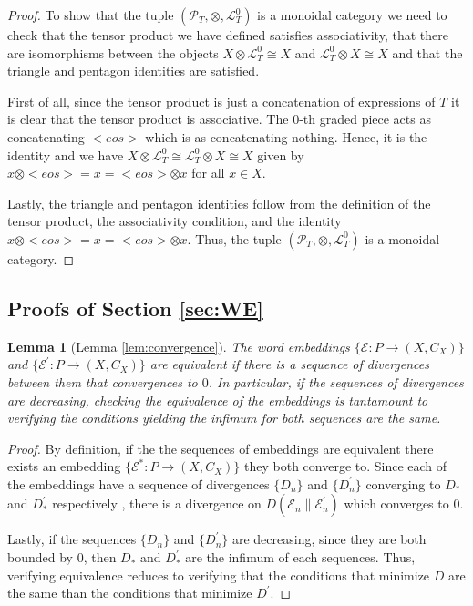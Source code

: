 \documentclass[10pt,a4paper]{elsarticle}
\renewcommand{\L}{\mathcal{L}}
\renewcommand{\P}{\mathcal{P}}
\newtheorem{lemma}[theorem]{Lemma}
\begin{document}
{\begin{proof}
		To show that the tuple $(\P_{T},\otimes, \L_{T}^{0})$ is a monoidal category we need to check that the tensor product we have defined satisfies associativity, that there are isomorphisms between the objects $X\otimes \L_{T}^{0}\cong X$ and $\L_{T}^{0}\otimes X\cong X$ and that the triangle and pentagon identities are satisfied.
		
		First of all, since the tensor product is just a concatenation of expressions of $T$ it is clear that the tensor product is associative. The $0$-th graded piece acts as concatenating $<eos>$ which is as concatenating nothing. Hence, it is the identity and we have $X\otimes \L_{T}^{0}\cong \L_{T}^{0}\otimes X\cong X$ given by $x\otimes <eos> = x = <eos>\otimes x$ for all $x\in X$.
		
		Lastly, the triangle and pentagon identities follow from the definition of the tensor product, the associativity condition, and the identity $x\otimes <eos> = x = <eos>\otimes x$. Thus, the tuple $(\P_{T},\otimes, \L_{T}^{0})$ is a monoidal category.
	\end{proof}
	
	\subsection{Proofs of Section \ref{sec:WE}}
	
	\begin{lemma}[Lemma \ref{lem:convergence}]\label{lem:convergenceA}
		The word embeddings $\{\mathcal{E}\colon P\to(X,C_{X})\}$ and $\{\mathcal{E}^{\prime}\colon P\to(X,C_{X})\}$ are equivalent if there is a sequence of divergences between them that convergences to $0$. In particular, if the sequences of divergences are decreasing, checking the equivalence of the embeddings is tantamount to verifying the conditions yielding the infimum for both sequences are the same.
	\end{lemma}
	
	\begin{proof}
		By definition, if the the sequences of embeddings are equivalent there exists an embedding $\{\mathcal{E}^{*}\colon P\to(X, C_{X})\}$ they both converge to. Since each of the embeddings have a sequence of divergences $\{D_{n}\}$ and $\{D_{n}^{\prime}\}$ 
		converging to $D_{*} $ and $D_{*}^{\prime}$ respectively , there is a divergence on $D(\mathcal{E}_{n}\| \mathcal{E}_{n}^{\prime})$ which converges to $0$.
		
		Lastly, if the sequences $\{D_{n}\}$ and $\{D_{n}^{\prime}\}$ are decreasing, since they are both bounded by $0$, then $ D_{*} $ and $D_{*}^{\prime}$ are the infimum of each sequences. Thus, verifying equivalence reduces to verifying that the conditions that minimize $ D $ are the same than the conditions that minimize $ D^{\prime} $. 
	\end{proof}
	
}
\end{document}
